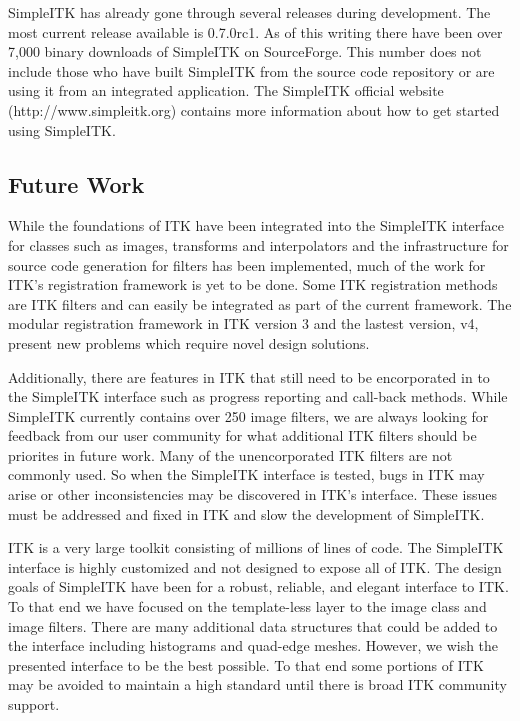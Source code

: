 \documentclass{frontiersMED} %
\begin{document}
SimpleITK has already gone through several releases during
development. The most current release available is 0.7.0rc1. As of
this writing there have been over 7,000 binary downloads of SimpleITK
on SourceForge. This number does not include those who have built SimpleITK
from the source code repository or are using it from an integrated
application. The SimpleITK official website (http://www.simpleitk.org)
contains more information about how to get started using SimpleITK.

\subsection{Future Work}
While the foundations of ITK have been integrated into the SimpleITK
interface for classes such as images, transforms and interpolators and the
infrastructure for source code generation for filters has been
implemented, much of the work for ITK's registration framework is yet
to be done. Some ITK registration methods are ITK filters and can easily
be integrated as part of the current framework. The modular
registration framework in ITK version 3 and the lastest version, v4,
present new problems which require novel design solutions.

Additionally, there are features in ITK that still need to be encorporated
in to the SimpleITK interface such as progress reporting and call-back
methods. While SimpleITK currently contains over 250 image filters,
we are always looking for feedback from our user community for
what additional ITK filters should be priorites in future
work. Many of the unencorporated ITK filters are not commonly used. So when the
SimpleITK interface is tested, bugs in ITK may arise or other
inconsistencies may be discovered in ITK's interface. These issues must be
addressed and fixed in ITK and slow the development of SimpleITK.

ITK is a very large toolkit consisting of millions of lines of
code. The SimpleITK interface is highly customized and not designed to
expose all of ITK. The design goals of SimpleITK have been
for a robust, reliable, and elegant interface to ITK. To that end we
have focused on the template-less layer to the image class and image
filters.  There are many additional data structures that could be
added to the interface including histograms and quad-edge
meshes. However, we wish the presented interface to be the best
possible. To that end some portions of ITK may be avoided to
maintain a high standard until there is broad ITK community support.
\end{document}
